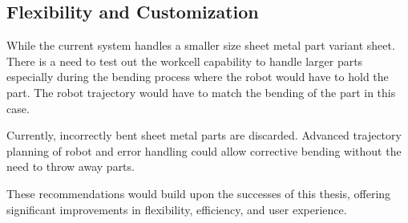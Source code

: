 \subsection{Flexibility and Customization}

While the current system handles a smaller size sheet metal part variant sheet. There is a need to test out the workcell capability to handle larger parts especially during the bending process where the robot would have to hold the part. The robot trajectory would have to match the bending of the part in this case.

Currently, incorrectly bent sheet metal parts are discarded. Advanced trajectory planning of robot and error handling could allow corrective bending without the need to throw away parts.


\vspace{1\baselineskip}
These recommendations would build upon the successes of this thesis, offering significant improvements in flexibility, efficiency, and user experience.